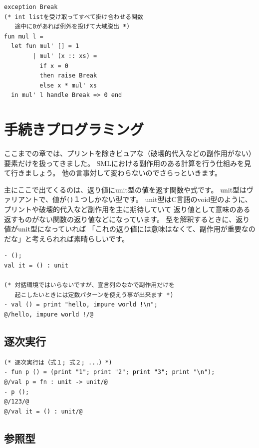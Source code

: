\documentclass[11pt,a4paper]{article}
\begin{document}
\begin{minipage}[htb]{0.6\linewidth}
\begin{lstlisting}[caption=例外を用いたプログラム例]
exception Break
(* int listを受け取ってすべて掛け合わせる関数　
   途中に0があれば例外を投げて大域脱出 *)
fun mul l =
  let fun mul' [] = 1
        | mul' (x :: xs) =
          if x = 0
          then raise Break
　　　　　　else x * mul' xs
  in mul' l handle Break => 0 end
\end{lstlisting}
\end{minipage}

\section{手続きプログラミング}

ここまでの章では、プリントを除きピュアな（破壊的代入などの副作用がない）要素だけを扱ってきました。
SMLにおける副作用のある計算を行う仕組みを見て行きましょう。
他の言事対して変わらないのでさらっといきます。

主にここで出てくるのは、返り値にunit型の値を返す関数や式です。
unit型はヴァリアントで、値が\lstinline{()}１つしかない型です。
unit型はC言語のvoid型のように、プリントや破壊的代入など副作用を主に期待していて
返り値として意味のある返すものがない関数の返り値などになっています。
型を解釈するときに、返り値がunit型になっていれば
「これの返り値には意味はなくて、副作用が重要なのだな」と考えられれば素晴らしいです。

\begin{lstlisting}
- ();
val it = () : unit

(* 対話環境ではいらないですが、宣言列のなかで副作用だけを
   起こしたいときには定数パターンを使えう事が出来ます *)
- val () = print "hello, impure world !\n";
@/hello, impure world !/@
\end{lstlisting}

\subsection{逐次実行}

\begin{lstlisting}[caption=逐次実行,label=code:sequence]
(* 逐次実行は（式１; 式２; ...）*)
- fun p () = (print "1"; print "2"; print "3"; print "\n");
@/val p = fn : unit -> unit/@
- p ();
@/123/@
@/val it = () : unit/@
\end{lstlisting}

\subsection{参照型}
\end{document}
